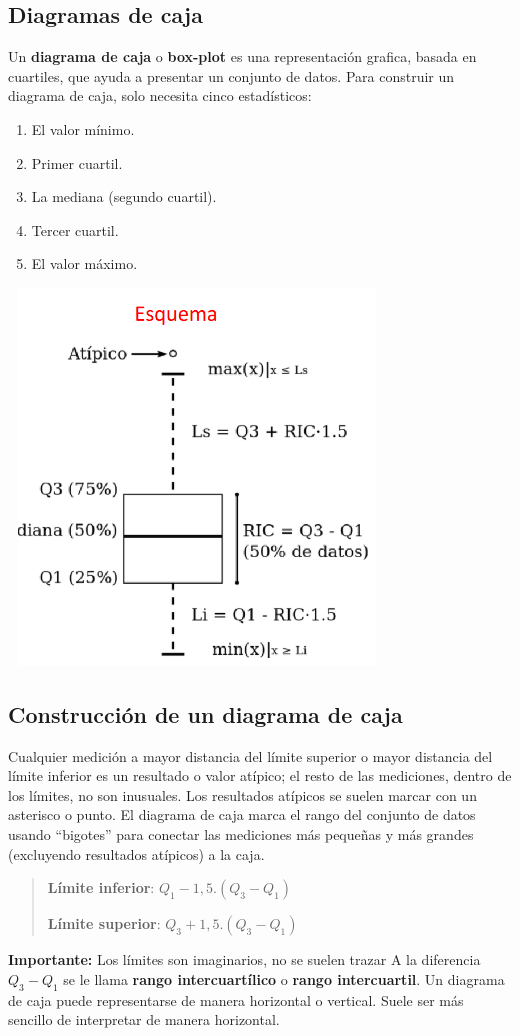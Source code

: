 \documentclass[]{article}
\begin{document}
\subsection{Diagramas de caja}
Un \textbf{diagrama de caja} o \textbf{box-plot} es una representación grafica, basada en cuartiles, que ayuda a presentar un conjunto de datos. Para construir un diagrama de caja, solo necesita cinco estadísticos:
\begin{enumerate}
	\item El valor mínimo.
	\item Primer cuartil.
	\item La mediana (segundo cuartil).
	\item Tercer cuartil.
	\item El valor máximo.
\end{enumerate}
\includegraphics[width=10cm,height=10cm]{imagenes/EsquemaDiagramaCajaCap4.PNG}
\subsection*{Construcción de un diagrama de caja}
Cualquier medición a mayor distancia del límite superior o mayor distancia del límite inferior es un resultado o valor atípico; el resto de las mediciones, dentro de los límites, no son inusuales. Los resultados atípicos se suelen marcar con un asterisco o punto. El diagrama de caja marca el rango del conjunto de datos usando “bigotes” para conectar las mediciones más pequeñas y más grandes (excluyendo resultados atípicos) a la caja.
\begin{quote}
	\textbf{Límite inferior}: $Q_{1} - 1,5.(Q_{3} - Q_{1})$
	\item \textbf{Límite superior}: $Q_{3} + 1,5.(Q_{3} - Q_{1})$
\end{quote}
\textbf{Importante: }Los límites son imaginarios, no se suelen trazar
A la diferencia \textbf{$Q_{3} - Q_{1}$} se le llama \textbf{rango intercuartílico} o \textbf{rango intercuartil}.
Un diagrama de caja puede representarse de manera horizontal o vertical. Suele ser más sencillo de interpretar de manera horizontal.
\end{document}
